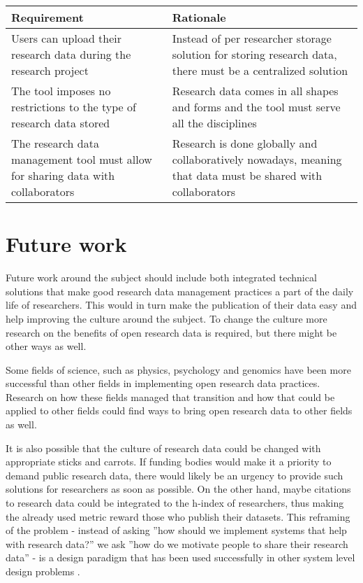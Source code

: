 \addtocounter{table}{-1}
\label{table:must_have_management}
    \begin{tabularx}{\textwidth}{| >{\raggedright}p{3cm} | X |}
    \hline
    \textbf{Requirement} & \textbf{Rationale} \\
    \hline
    \rowcolor{Gray}
    Users can upload their research data during the research project    & Instead of per researcher storage solution for storing research data, there must be a centralized solution\\
    \hline
    The tool imposes no restrictions to the type of research data stored & Research data comes in all shapes and forms and the tool must serve all the disciplines\\
    \hline
    \rowcolor{Gray}
    The research data management tool must allow for sharing data with collaborators    &  Research is done globally and collaboratively nowadays, meaning that data must be shared with collaborators\\
    \hline
\end{tabularx}

\section{Future work}

Future work around the subject should include both integrated
technical solutions that make good research data management practices a part of the
daily life of researchers. This would in turn make the publication of their data easy
and help improving the culture around the subject.
To change the culture more research on the benefits of open research data
is required, but there might be other ways as well.

Some fields of science, such as physics, psychology and genomics have been
more successful than other fields in implementing open research data practices.
Research on how these fields managed that transition and how that could be applied
to other fields could find ways to bring open research data to other
fields as well.

It is also possible that the culture of research data could be changed with
appropriate sticks and carrots. If funding bodies would make it a priority
to demand public research data, there would likely be an urgency to provide
such solutions for researchers as soon as possible. On the other hand, maybe
citations to research data could be integrated to the h-index of researchers,
thus making the already used metric reward those who publish their datasets.
This reframing of the problem - instead of asking ''how should we implement
systems that help with research data?'' we ask ''how do we motivate people
to share their research data'' - is a design paradigm that has been used
successfully in other system level design problems \cite{dorst2015frame}.

